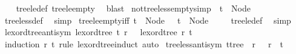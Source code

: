 \begin{isabellebody}
%
\isadelimproof
\ \ %
\endisadelimproof
%
\isatagproof
{}\isamarkupfalse%
\ tree{\isacharunderscore}{\kern0pt}le{\isacharunderscore}{\kern0pt}def\ tree{\isacharunderscore}{\kern0pt}le{\isacharunderscore}{\kern0pt}empty\ \isamarkupfalse%
\ blast%
\endisatagproof
{\isafoldproof}%
%
\isadelimproof
\isanewline
%
\endisadelimproof
\isanewline
{}\isamarkupfalse%
\ not{\isacharunderscore}{\kern0pt}tree{\isacharunderscore}{\kern0pt}less{\isacharunderscore}{\kern0pt}empty{\isacharbrackleft}{\kern0pt}simp{\isacharbrackright}{\kern0pt}{\isacharcolon}{\kern0pt}\ {\isachardoublequoteopen}{\isasymnot}\ t\ {\isacharless}{\kern0pt}\ Node\ {\isacharbrackleft}{\kern0pt}{\isacharbrackright}{\kern0pt}{\isachardoublequoteclose}\isanewline
%
\isadelimproof
\ \ %
\endisadelimproof
%
\isatagproof
{}\isamarkupfalse%
\ tree{\isacharunderscore}{\kern0pt}less{\isacharunderscore}{\kern0pt}def\ \isamarkupfalse%
\ simp%
\endisatagproof
{\isafoldproof}%
%
\isadelimproof
\isanewline
%
\endisadelimproof
\isanewline
{}\isamarkupfalse%
\ tree{\isacharunderscore}{\kern0pt}le{\isacharunderscore}{\kern0pt}empty{}{\isacharunderscore}{\kern0pt}iff{\isacharcolon}{\kern0pt}\ {\isachardoublequoteopen}t\ {\isasymle}\ Node\ {\isacharbrackleft}{\kern0pt}{\isacharbrackright}{\kern0pt}\ {\isasymLongrightarrow}\ t\ {\isacharequal}{\kern0pt}\ Node\ {\isacharbrackleft}{\kern0pt}{\isacharbrackright}{\kern0pt}{\isachardoublequoteclose}\isanewline
%
\isadelimproof
\ \ %
\endisadelimproof
%
\isatagproof
{}\isamarkupfalse%
\ tree{\isacharunderscore}{\kern0pt}le{\isacharunderscore}{\kern0pt}def\ \isamarkupfalse%
\ simp%
\endisatagproof
{\isafoldproof}%
%
\isadelimproof
\isanewline
%
\endisadelimproof
\isanewline
{}\isamarkupfalse%
\ lexord{\isacharunderscore}{\kern0pt}tree{\isacharunderscore}{\kern0pt}antisym{\isacharcolon}{\kern0pt}\ {\isachardoublequoteopen}lexord{\isacharunderscore}{\kern0pt}tree\ t\ r\ {\isasymLongrightarrow}\ {\isasymnot}\ lexord{\isacharunderscore}{\kern0pt}tree\ r\ t{\isachardoublequoteclose}\isanewline
%
\isadelimproof
\ \ %
\endisadelimproof
%
\isatagproof
{}\isamarkupfalse%
\ {\isacharparenleft}{\kern0pt}induction\ r\ t\ rule{\isacharcolon}{\kern0pt}\ lexord{\isacharunderscore}{\kern0pt}tree{\isachardot}{\kern0pt}induct{\isacharparenright}{\kern0pt}\ auto%
\endisatagproof
{\isafoldproof}%
%
\isadelimproof
\isanewline
%
\endisadelimproof
\isanewline
{}\isamarkupfalse%
\ tree{\isacharunderscore}{\kern0pt}less{\isacharunderscore}{\kern0pt}antisym{\isacharcolon}{\kern0pt}\ {\isachardoublequoteopen}{\isacharparenleft}{\kern0pt}t{\isacharcolon}{\kern0pt}{\isacharcolon}{\kern0pt}tree{\isacharparenright}{\kern0pt}\ {\isacharless}{\kern0pt}\ r\ {\isasymLongrightarrow}\ {\isasymnot}\ r\ {\isacharless}{\kern0pt}\ t{\isachardoublequoteclose}\isanewline

\end{isabellebody}

